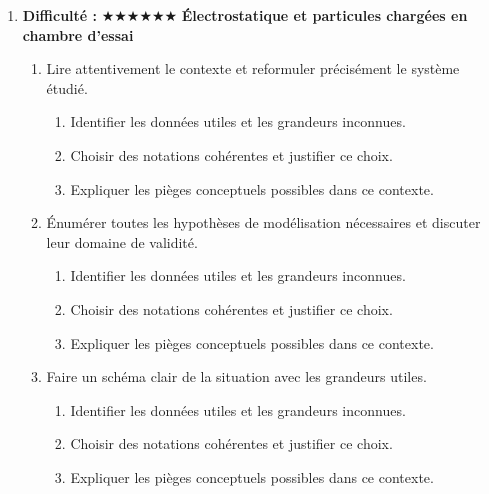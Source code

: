 \documentclass[11pt,a4paper]{article}
\newcommand{\etoiles}[1]{\textbf{Difficulté : }#1}
\begin{document}
\begin{enumerate}[label=\textbf{Très long \arabic*.},leftmargin=*]
\begin{enumerate}[label=\textbf{\arabic*)}]
\begin{enumerate}[label=\alph*)]
\item Proposer une ouverture vers une situation réelle plus complexe.
\end{enumerate}
\item Rédiger une conclusion scientifique : résultats, limites, prolongements vers la Terminale ou au-delà.
\begin{enumerate}[label=\alph*)]
\item Comparer au moins deux scénarios différents.
\item Discuter la robustesse du résultat face à une variation de paramètre.
\item Proposer une ouverture vers une situation réelle plus complexe.
\end{enumerate}
\end{enumerate}
\item \etoiles{★★★★★★}
\textbf{Électrostatique et particules chargées en chambre d'essai}
\begin{enumerate}[label=\textbf{\arabic*)}]
\item Lire attentivement le contexte et reformuler précisément le système étudié.
\begin{enumerate}[label=\alph*)]
\item Identifier les données utiles et les grandeurs inconnues.
\item Choisir des notations cohérentes et justifier ce choix.
\item Expliquer les pièges conceptuels possibles dans ce contexte.
\end{enumerate}
\item Énumérer toutes les hypothèses de modélisation nécessaires et discuter leur domaine de validité.
\begin{enumerate}[label=\alph*)]
\item Identifier les données utiles et les grandeurs inconnues.
\item Choisir des notations cohérentes et justifier ce choix.
\item Expliquer les pièges conceptuels possibles dans ce contexte.
\end{enumerate}
\item Faire un schéma clair de la situation avec les grandeurs utiles.
\begin{enumerate}[label=\alph*)]
\item Identifier les données utiles et les grandeurs inconnues.
\item Choisir des notations cohérentes et justifier ce choix.
\item Expliquer les pièges conceptuels possibles dans ce contexte.

\end{enumerate}
\end{enumerate}
\end{enumerate}
\end{document}
